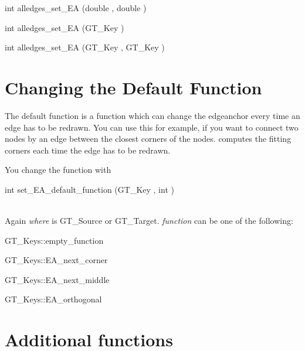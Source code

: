 \documentclass[twoside,fleqn]{report}
\begin{document}
\begin{Cdefinition}

  \item[int alledges\_set\_EA (double \Param{delta$_x$}, 
    double \Param{delta$_y$})] \strut
  \item[int alledges\_set\_EA (GT\_Key \Param{direction})] \strut
  \item[int alledges\_set\_EA (GT\_Key \Param{source\_key}, 
    GT\_Key \Param{target\_key})] \strut
\end{Cdefinition}  


\section{Changing the Default Function}

The default function is a function which can change the edgeanchor every time
an edge has to be redrawn.
You can use this for example, if you want to connect two nodes by an edge
between the closest corners of the nodes.
\Graphlet{} computes the fitting corners each time the edge has to be redrawn.

You change the function with
\begin{Cdefinition}                
  \item[int set\_EA\_default\_function (GT\_Key \Param{function}, 
    int \Param{where})] \strut\\
    Again \emph{where} is GT\_Source or GT\_Target.
    \emph{function} can be one of the following:
    
    \begin{ttdescription}
      \item[GT\_Keys::empty\_function] \strut
      \item[GT\_Keys::EA\_next\_corner] \strut
      \item[GT\_Keys::EA\_next\_middle] \strut
      \item[GT\_Keys::EA\_orthogonal] \strut
    \end{ttdescription}
\end{Cdefinition}  

\section{Additional functions}
\end{document}
